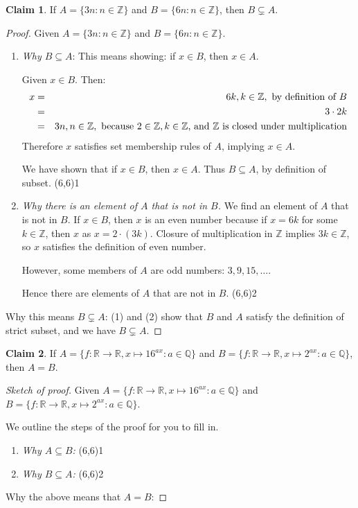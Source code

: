 \documentclass[11pt]{article}
\newcommand\tn{\textnormal}
\newcommand{\R}{\mathbb{R}}
\newcommand{\Q}{\mathbb{Q}}
\newcommand{\Z}{\mathbb{Z}}
\renewcommand\subset\subseteq
\newcommand\st{:}
\theoremstyle{definition}
\newtheorem*{claim*}{Claim}
\newcommand\qedpart[1]{ \hfill \framebox(6,6){\tiny #1}}
\begin{document}
\begin{claim*}
If $A=\{ 3n \st n \in \Z\}$ and $B=\{ 6n \st n\in \Z\}$, then $B\subsetneq A$.
\end{claim*}
\begin{proof}
Given $A=\{ 3n \st n \in \Z\}$ and $B=\{ 6n \st n\in \Z\}$. 

\begin{enumerate}
\item {\it Why $B\subset A$}: This means showing: if $x\in B$, then $x\in A$.

Given $x\in B$. Then:
	\begin{eqnarray*}
	x &=&6k, k\in \Z, \tn{ by definition of $B$} \\ 
	   &=& 3\cdot 2k \\ 
	   &=& 3n, n\in \Z, \tn{ because $2\in \Z, k\in \Z$, and $\Z$ is closed under multiplication}
	\end{eqnarray*}
Therefore $x$ satisfies set membership rules of $A$, implying $x\in A$. 

We have shown that if $x\in B$, then $x\in A$. Thus $B\subset A$, by definition of subset. \qedpart{1}

\item {\it Why there is an element of $A$ that is not in $B$.} We find an element of $A$ that is not in $B$.
If $x\in B$, then $x$ is an even number because if $x=6k$ for some $k\in\Z$, then $x$ as $x=2\cdot (3k)$. Closure of multiplication in $\Z$ implies $3k\in \Z$, so $x$ satisfies the definition of even number. 

However, some members of $A$ are odd numbers: $3, 9, 15, \dots $. 

Hence there are elements of $A$ that are not in $B$. \qedpart{2}

\end{enumerate}
Why this means $B\subsetneq A$: (1) and (2) show that $B$ and $A$ satisfy the definition of strict subset, and we have $B\subsetneq A$.
\end{proof}

\begin{claim*}
If $A=\{f:\R\to \R, x\mapsto 16^{ax} \st a\in \Q\}$ and $B=\{f:\R\to \R, x\mapsto 2^{ax} \st a\in \Q\}$, then $A=B$.
\end{claim*}
\begin{proof}[Sketch of proof] 
Given $A=\{f:\R\to \R, x\mapsto 16^{ax} \st a\in \Q\}$ and $B=\{f:\R\to \R, x\mapsto 2^{ax} \st a\in \Q\}$.

We outline the steps of the proof for you to fill in.

\begin{enumerate}
\item {\it Why $A\subset B$:} \qedpart{1}


\item {\it Why $B\subset A$:} \qedpart{2}
\end{enumerate}

Why the above means that $A=B$:
\end{proof}
\end{document}
